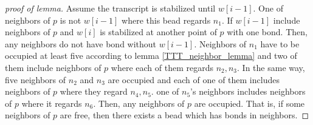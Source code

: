 \begin{proof}[proof of lemma]
Assume the transcript is stabilized until $w[i-1]$. One of neighbors of $p$ is not $w[i-1]$ where this bead regards $n_1$. If $w[i-1]$ include neighbors of $p$ and $w[i]$ is stabilized at another point of $p$ with one bond. Then, any neighbors do not have bond without $w[i-1]$. Neighbors of $n_1$ have to be occupied at least five according to lemma \ref{TTT_neighbor_lemma} and two of them include neighbors of $p$ where each of them regards $n_2, n_3$. In the same way, five neighbors of $n_2$ and $n_3$ are occupied and each of one of them includes neighbors of $p$ where they regard $n_4, n_5$. one of $n_5$'s neighbors includes neighbors of $p$ where it regards $n_6$. Then, any neighbors of $p$ are occupied. That is, if some neighbors of $p$ are free, then there exists a bead which has bonds in neighbors.
\end{proof}

